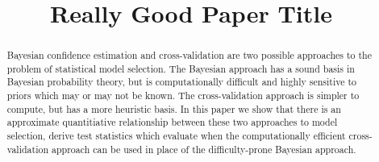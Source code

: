 \documentclass[12pt,pdftex]{article}
\title{Really Good Paper Title}
\author{}
\newcommand{\paper}{paper}
\begin{document}
\maketitle

\begin{abstract}
  Bayesian confidence estimation and cross-validation are two possible
  approaches to the problem of statistical model selection.  The Bayesian
  approach has a sound basis in Bayesian probability theory, but is
  computationally difficult and highly sensitive to priors which may or may
  not be known.  The cross-validation approach is simpler to compute, but
  has a more heuristic basis.  In this \paper{} we show that there is an
  approximate quantitiative relationship between these two approaches to
  model selection, derive test statistics which evaluate when the
  computationally efficient cross-validation approach can be used in place
  of the difficulty-prone Bayesian approach.
\end{abstract}

\end{document}
